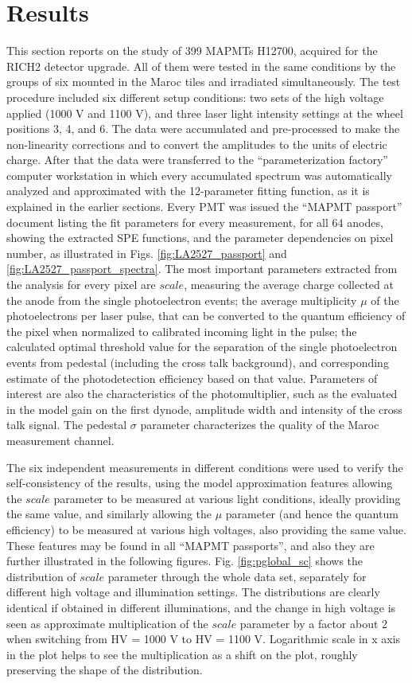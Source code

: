 \section{Results}

This section reports on the study of 399 MAPMTs H12700, acquired for the RICH2 detector upgrade. All of them were tested in the same conditions by the groups of six mounted in the Maroc tiles and irradiated simultaneously. The test procedure included six different setup conditions: two sets of the high voltage applied (1000 V and 1100 V), and three laser light intensity settings at the wheel positions 3, 4, and 6. The data were accumulated and pre-processed to make the non-linearity corrections and to convert the amplitudes to the units of electric charge. After that the data were transferred to the ``parameterization factory'' computer workstation in which every accumulated spectrum was automatically analyzed and approximated with the 12-parameter fitting function, as it is explained in the earlier sections. Every PMT was issued the ``MAPMT passport'' document listing the fit parameters for every measurement, for all 64 anodes, showing the extracted SPE functions, and the parameter dependencies on pixel number, as illustrated in Figs. \ref{fig:LA2527_passport} and \ref{fig:LA2527_passport_spectra}. The most important parameters extracted from the analysis for every pixel are $scale$, measuring the average charge collected at the anode from the single photoelectron events; the average multiplicity $\mu$ of the photoelectrons per laser pulse, that can be converted to the quantum efficiency of the pixel when normalized to calibrated incoming light in the pulse; the calculated optimal threshold value for the separation of the single photoelectron events from pedestal (including the cross talk background), and corresponding estimate of the photodetection efficiency based on that value. Parameters of interest are also the characteristics of the photomultiplier, such as the evaluated in the model gain on the first dynode, amplitude width and intensity of the cross talk signal. The pedestal $\sigma$ parameter characterizes the quality of the Maroc measurement channel.

The six independent measurements in different conditions were used to verify the self-consistency of the results, using the model approximation features allowing the $scale$ parameter to be measured at various light conditions, ideally providing the same value, and similarly allowing the $\mu$ parameter (and hence the quantum efficiency) to be measured at various high voltages, also providing the same value. These features may be found in all ``MAPMT passports'', and also they are further illustrated in the following figures. Fig. \ref{fig:pglobal_sc} shows the distribution of $scale$ parameter through the whole data set, separately for different high voltage and illumination settings. The distributions are clearly identical if obtained in different illuminations, and the change in high voltage is seen as approximate multiplication of the $scale$ parameter by a factor about 2 when switching from HV = 1000 V to HV = 1100 V. Logarithmic scale in x axis in the plot helps to see the multiplication as a shift on the plot, roughly preserving the shape of the distribution. 

